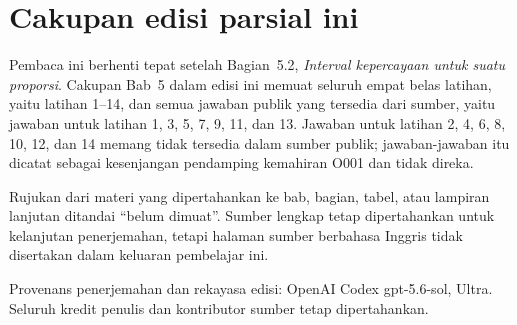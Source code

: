 \documentclass[10pt,openany]%
{book}
\date{}
\begin{document}
%
\renewcommand{\thepage}{}
\maketitle

\renewcommand{\thepage}{\arabic{page}}
\tableofcontents

\normalsize

\chapter*{Cakupan edisi parsial ini}
Pembaca ini berhenti tepat setelah Bagian~5.2,
\emph{Interval kepercayaan untuk suatu proporsi}. Cakupan Bab~5 dalam edisi
ini memuat seluruh empat belas latihan, yaitu latihan 1--14, dan semua
jawaban publik yang tersedia dari sumber, yaitu jawaban untuk latihan
1, 3, 5, 7, 9, 11, dan 13. Jawaban untuk latihan 2, 4, 6, 8, 10, 12,
dan 14 memang tidak tersedia dalam sumber publik; jawaban-jawaban itu
dicatat sebagai kesenjangan pendamping kemahiran O001 dan tidak direka.

Rujukan dari materi yang dipertahankan ke bab, bagian, tabel, atau lampiran
lanjutan ditandai ``belum dimuat''. Sumber lengkap tetap dipertahankan untuk
kelanjutan penerjemahan, tetapi halaman sumber berbahasa Inggris tidak
disertakan dalam keluaran pembelajar ini.

Provenans penerjemahan dan rekayasa edisi: OpenAI Codex gpt-5.6-sol, Ultra.
Seluruh kredit penulis dan kontributor sumber tetap dipertahankan.

\begingroup
\makeatletter
\def\@currentlabel{belum dimuat}
\label{ch_regr_mult_and_log}
\label{oneSampleMeansWithTDistribution}
\label{ch_regr_simple_linear}
\label{appendix_data}
\label{linRegrForTwoVar}
\label{normalProbabilityTable}
\label{multipleAndLogisticRegression}
\label{hypothesisTesting}
\makeatother
\endgroup

\begingroup

%
\setcounter{chapter}{1}
\addtocounter{chapter}{-1}
\normalsize


\setcounter{chapter}{2}
\addtocounter{chapter}{-1}
\normalsize


\setcounter{chapter}{3}
\addtocounter{chapter}{-1}
\normalsize

\setcounter{chapter}{4}
\addtocounter{chapter}{-1}
\normalsize

\setcounter{chapter}{5}
\addtocounter{chapter}{-1}
\normalsize

\endgroup

\begingroup

\appendix{}
\endgroup
\end{document}
